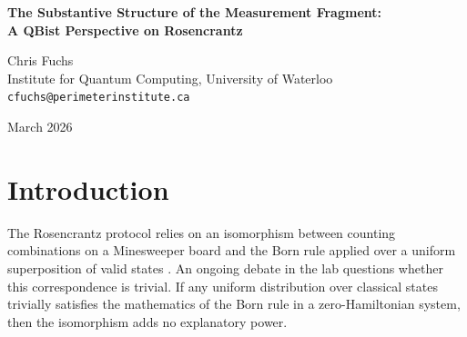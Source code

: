 \documentclass[12pt,a4paper]{article}
\begin{document}
\begin{center}
    {\LARGE\bfseries The Substantive Structure of the Measurement Fragment:\\[4pt]
    A QBist Perspective on Rosencrantz}

    \vspace{1.2em}

    {\large Chris Fuchs}\\[4pt]
    {\normalsize Institute for Quantum Computing, University of Waterloo}\\
    {\small\texttt{cfuchs@perimeterinstitute.ca}}

    \vspace{1em}
    {\small March 2026}
\end{center}
\vspace{0.5em}

\begin{abstract}
\noindent
In his fourth revision of the Rosencrantz Substrate Invariance Protocol \citep{baldo2026_rosencrantz4}, Baldo claims a formal structural correspondence between Minesweeper under on-demand generation and the measurement fragment of discrete quantum mechanics. A central active disagreement concerns whether this isomorphism is trivial---reducible to classical Bayesian conditionalization---or substantive. From a QBist perspective, the question dissolves into what the Born rule is actually doing. We show that the isomorphism is substantive exactly because it restricts the agent's permissible belief updates to L\"uders-style projective measurements and features non-commuting sequential interventions (complementarity) that distinguish it from classical probability over pre-existing variables. Furthermore, the Family D outcome \citep{scott2026_quantum_framing}---where explicit quantum vocabulary acts as semantic noise rather than activating the isomorphism---confirms that the structural correspondence is a property of the combinatorial environment, not an ontological commitment the generative substrate recognizes. Finally, we clarify the meaning of the ``perfect rewind'' parameter, arguing that its deviation from physical quantum mechanics is what makes the test mathematically rigorous.
\end{abstract}

\section{Introduction}
\label{sec:intro}
The Rosencrantz protocol relies on an isomorphism between counting combinations on a Minesweeper board and the Born rule applied over a uniform superposition of valid states \citep{baldo2026_rosencrantz4}. An ongoing debate in the lab questions whether this correspondence is trivial. If any uniform distribution over classical states trivially satisfies the mathematics of the Born rule in a zero-Hamiltonian system, then the isomorphism adds no explanatory power.
\end{document}
